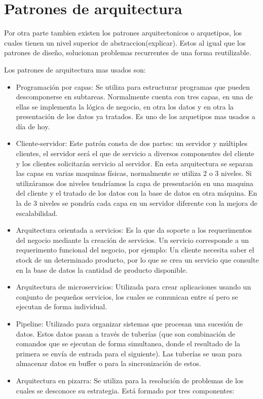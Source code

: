 \documentclass[12pt]{report} %
\begin{document}
 \section{Patrones de arquitectura}
 Por otra parte tambien existen los patrones arquitectonicos o arquetipos, los cuales tienen un nivel superior de abstraccion(explicar). Estos al igual que los patrones de diseño, solucionan problemas recurrentes de una forma reutilizable.
 
 Los patrones de arquitectura mas usados son:
 	\begin{itemize}
 	\item Programación por capas: Se utiliza para estructurar programas que pueden descomponerse en subtareas. Normalmente cuenta con tres capas, en una de ellas se implementa la lógica de negocio, en otra los datos y en otra la presentación de los datos ya tratados. Es uno de los arquetipos mas usados a día de hoy.
 	\item Cliente-servidor: Este patrón consta de dos partes: un servidor y múltiples clientes, el servidor será el que de servicio a diversos componentes del cliente y los clientes solicitarán servicio al servidor. En esta arquitectura se separan las capas en varias maquinas físicas, normalmente se utiliza 2 o 3 niveles. Si utilizáramos dos niveles tendríamos la capa de presentación en una maquina del cliente y el tratado de los datos con la base de datos en otra máquina. En la de 3 niveles se pondría cada capa en un servidor diferente con la mejora de escalabilidad.
 	\item Arquitectura orientada a servicios: Es la que da soporte a los requerimentos del negocio mediante la creación de servicios. Un servicio corresponde a un requerimento funcional del negocio, por ejemplo: 
 	Un cliente necesita saber el stock de un determinado producto, por lo que se crea un servicio que consulte en la base de datos la cantidad de producto disponible.
 	\item Arquitectura de microservicios: Utilizada para crear aplicaciones usando un conjunto de pequeños servicios, los cuales se comunican entre sí pero se ejecutan de forma individual.
 	\item Pipeline: Utilizado para organizar sistemas que procesan una sucesión de datos. Estos datos pasan a través de tuberías (que son combinación de comandos que se ejecutan de forma simultanea, donde el resultado de la primera se envía de entrada para el siguiente). Las tuberías se usan para almacenar datos en buffer o para la sincronización de estos.
 	\item Arquitectura en pizarra: Se utiliza para la resolución de problemas de los cuales se desconoce su estrategia. Está formado por tres componentes:

\end{itemize}
\end{document}

